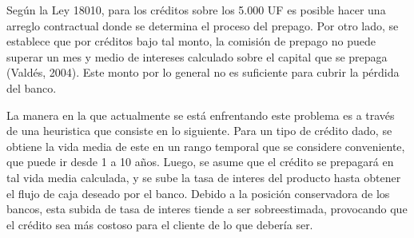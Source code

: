 \qquad Según la Ley 18010, para los créditos sobre los 5.000 UF  es posible hacer una arreglo contractual donde se determina el proceso del prepago. Por otro lado, se establece que por créditos bajo tal monto, la comisión de prepago no puede superar un mes y medio de intereses calculado sobre el capital que se prepaga (Valdés, 2004). Este monto por lo general no es suficiente para cubrir la pérdida del banco.

\qquad La manera en la que actualmente se está enfrentando este problema es a través de una heuristica que consiste en lo siguiente. Para un tipo de crédito dado, se obtiene la vida media de este en un rango temporal que se considere conveniente, que puede ir desde 1 a 10 años. Luego, se asume que el crédito se prepagará en tal vida media calculada, y se sube la tasa de interes del producto hasta obtener el flujo de caja deseado por el banco. Debido a la posición conservadora de los bancos, esta subida de tasa de interes tiende a ser sobreestimada, provocando que el crédito sea más costoso para el cliente de lo que debería ser.